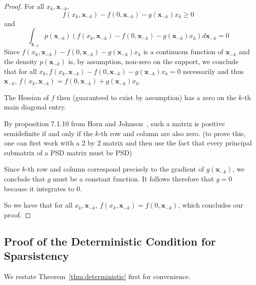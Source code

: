 \begin{proof}
For all $x_k, \mathbf{x}_{-k}$, 
\[
f(x_k, \mathbf{x}_{-k}) - f(0, \mathbf{x}_{-k}) - g(\mathbf{x}_{-k}) x_k \geq 0
\]
and
\[
\int_{\mathbf{x}_{-k}} p(\mathbf{x}_{-k}) (f(x_k, \mathbf{x}_{-k}) - f(0, \mathbf{x}_{-k}) - g(\mathbf{x}_{-k}) x_k) d\mathbf{x}_{-k} = 0
\]
Since $f(x_k, \mathbf{x}_{-k}) - f(0, \mathbf{x}_{-k}) - g(\mathbf{x}_{-k}) x_k$ is a continuous function of $\mathbf{x}_{-k}$ and the density $p(\mathbf{x}_{-k})$ is, by assumption, non-zero on the support, we conclude that for all $x_k, f(x_k, \mathbf{x}_{-k}) - f(0, \mathbf{x}_{-k}) - g(\mathbf{x}_{-k}) x_k =0 $ necessarily and thus $\mathbf{x}_{-k}$, $f(x_k, \mathbf{x}_{-k}) = f(0, \mathbf{x}_{-k}) + g(\mathbf{x}_{-k}) x_k$.

The Hessian of $f$ then (guaranteed to exist by assumption) has a zero on the $k$-th main diagonal entry. 

By proposition 7.1.10 from Horn and Johnson~\cite{HJ90},  such a matrix is positive semidefinite if and only if the $k$-th row and column are also zero. (to prove this, one can first work with a 2 by 2 matrix and then use the fact that every principal submatrix of a PSD matrix must be PSD) 

Since $k$-th row and column correspond precisely to the gradient of $g(\mathbf{x}_{-k})$, we conclude that $g$ must be a constant function. It follows therefore that $g = 0$ because it integrates to 0. 

So we have that for all $x_k, \mathbf{x}_{-k}$, $f(x_k, \mathbf{x}_{-k}) = f(0, \mathbf{x}_{-k})$, which concludes our proof.

\end{proof}
 
 
 
 
 

 
 
 
 \subsection{Proof of the Deterministic Condition for Sparsistency}
 \label{sec:deterministic_proof}
 
 We restate Theorem~\ref{thm:deterministic} first for convenience.
 
